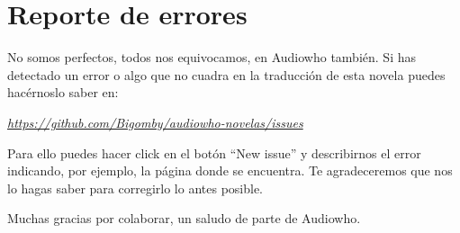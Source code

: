 \cleardoublepage

\section*{Reporte de errores}

No somos perfectos, todos nos equivocamos, en Audiowho también. Si has detectado un error o algo que no cuadra en la traducción de esta novela puedes hacérnoslo saber en:

\mbox{}

\begin{center}
\href{https://github.com/Bigomby/audiowho-novelas/issues}{\textit{https://github.com/Bigomby/audiowho-novelas/issues}}
\end{center}

\mbox{}

Para ello puedes hacer click en el botón “New issue” y describirnos el error indicando, por ejemplo, la página donde se encuentra. Te agradeceremos que nos lo hagas saber para corregirlo lo antes posible.

\mbox{}

Muchas gracias por colaborar, un saludo de parte de Audiowho.